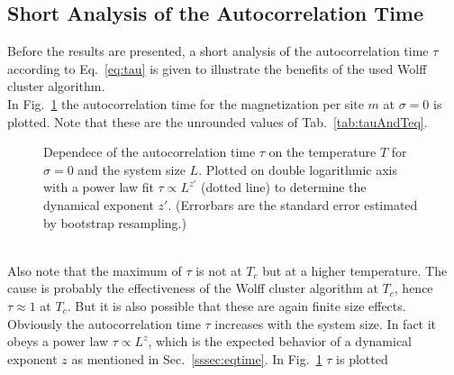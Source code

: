 \subsection{Short Analysis of the Autocorrelation Time}
\label{ssec:results:autocorr}
    Before the results are presented, a short analysis of the
    autocorrelation time \(\tau\) according to Eq.\ \ref{eq:tau} is given to
    illustrate the benefits of the used Wolff cluster algorithm.\\
    In Fig.\ \ref{fig:autocorr}
    the autocorrelation time for the magnetization per site \(m\) at
    \(\sigma=0\) is plotted. Note that these are the unrounded values
    of Tab.\ \ref{tab:tauAndTeq}.
    \begin{figure}[htbp]
        \centering
        \caption[The Autocorrelation Time $\tau$]
        {
            Dependece of the autocorrelation time $\tau$ on
             the temperature $T$ for
                $\sigma=0$ and
             the system size $L$. Plotted on
                double logarithmic axis with a power law fit \(\tau \propto L^{z'}\) (dotted line)
                to determine the dynamical exponent \(z'\).
                (Errorbars are the standard error estimated by bootstrap resampling.)
        }
        \label{fig:autocorr}
    \end{figure}\\
    Also note that the maximum of \(\tau\) is not at \(T_c\) but at a higher
    temperature. The cause is probably the effectiveness of the Wolff cluster
    algorithm at \(T_c\), hence \(\tau \approx 1\) at \(T_{c}\).
    But it is also possible that these are again finite size effects.
    Obviously the autocorrelation time \(\tau\) increases with the system
    size. In fact it obeys a power law \(\tau \propto L^z\), which is
    the expected behavior of a dynamical exponent \(z\) as mentioned in
    Sec.\ \ref{sssec:eqtime}.
    In Fig.\ \ref{fig:autocorr} \(\tau\) is plotted
